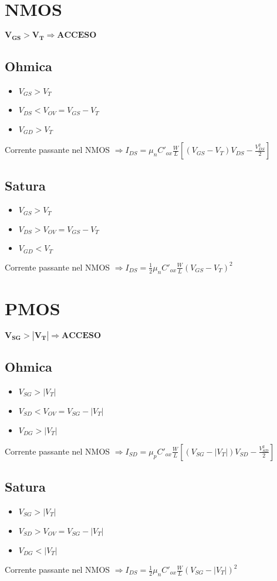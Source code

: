\documentclass[12pt, letterpaper]{article}
\begin{document}
\section{NMOS}
$\mathbf{V_{GS} > V_T \Rightarrow ACCESO}$

\subsection{Ohmica}
\begin{itemize}
    \item $V_{GS} > V_T$
    \item $V_{DS} < V_{OV} = V_{GS} - V_T$
    \item $V_{GD} > V_T$
\end{itemize}

Corrente passante nel NMOS $\Rightarrow I_{DS} = \mu_nC'_{ox}\frac{W}{L}\left[\left(V_{GS}-V_T\right)V_{DS}-\frac{V_{DS}^2}{2}\right]$

\subsection{Satura}
\begin{itemize}
    \item $V_{GS} > V_T$
    \item $V_{DS} > V_{OV} = V_{GS} - V_T$
    \item $V_{GD} < V_T$
\end{itemize}

Corrente passante nel NMOS $\Rightarrow I_{DS}=\frac{1}{2}\mu_nC'_{ox}\frac{W}{L}\left(V_{GS}-V_T\right)^2$

\newpage
\section{PMOS}
$\mathbf{V_{SG} > \left|V_T\right| \Rightarrow ACCESO}$

\subsection{Ohmica}
\begin{itemize}
    \item $V_{SG} > |V_T|$
    \item $V_{SD} < V_{OV} = V_{SG} - |V_T|$
    \item $V_{DG} > |V_T|$
\end{itemize}

Corrente passante nel NMOS $\Rightarrow I_{SD} = \mu_pC'_{ox}\frac{W}{L}\left[\left(V_{SG}-|V_T|\right)V_{SD}-\frac{V_{SD}^2}{2}\right]$

\subsection{Satura}
\begin{itemize}
    \item $V_{SG} > |V_T|$
    \item $V_{SD} > V_{OV} = V_{SG} - |V_T|$
    \item $V_{DG} < |V_T|$
\end{itemize}

Corrente passante nel NMOS $\Rightarrow I_{DS}=\frac{1}{2}\mu_nC'_{ox}\frac{W}{L}\left(V_{SG}-|V_T|\right)^2$
\end{document}

